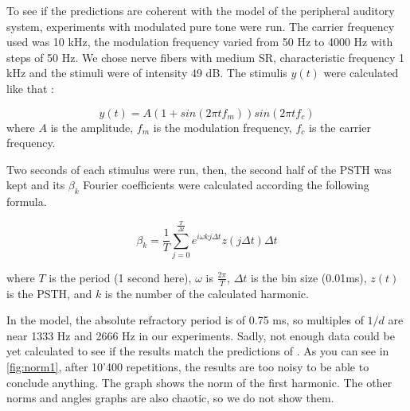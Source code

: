 To see if the predictions are coherent with the model of the peripheral auditory 
system, experiments with modulated pure tone were run. 
The carrier frequency used was 10 kHz, the modulation frequency varied from 50 Hz to 4000 Hz
with steps of 50 Hz. We chose nerve fibers with medium SR, characteristic frequency 1 kHz 
and the stimuli were of intensity 49 dB.
The stimulis $y\left(t\right)$ were calculated like that :

\begin{equation}\label{freqstim} y\left(t\right) = A \left(1+sin \left(2 \pi t f_m \right)\right) sin \left(2 \pi t f_c \right)\end{equation} %
where $A$ is the amplitude,
$f_m$ is the modulation frequency,
$f_c$ is the carrier frequency.

 
Two seconds of each stimulus were run, 
then, the second half of the PSTH was kept and its $\beta_k$ Fourier coefficients were calculated according the following formula.

\begin{equation}\label{bkformula} \beta_k = \frac{1}{T} \sum_{j= 0}^{\frac{T}{\Delta t}} e^{i \omega k j \Delta t} z \left( j \Delta t\right)\Delta t\end{equation}

where $T$ is the period (1 second here), %
 $\omega$ is $\frac{2\pi}{T}$,
$\Delta t$ is the bin size (0.01ms),
$z\left(t\right)$ is the PSTH,
and $k$ is the number of the calculated harmonic.

In the model, the absolute refractory period is of 0.75 ms, so multiples of $1/d$ are near 1333 Hz and 2666 Hz in our experiments.
Sadly, not enough data could be yet calculated to see if the results match the predictions of 
\cite{Deger}. 
As you can see in \autoref{fig:norm1}, after 10'400 repetitions, the results are too noisy to be able to conclude anything. %
The graph shows the norm of the first harmonic. The other norms and angles graphs are also chaotic, so we do not show them.












 